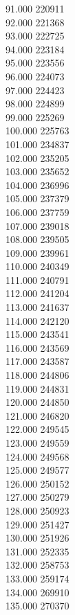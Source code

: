 { 91.000	220911 \\
 92.000	221368 \\
 93.000	222725 \\
 94.000	223184 \\
 95.000	223556 \\
 96.000	224073 \\
 97.000	224423 \\
 98.000	224899 \\
 99.000	225269 \\
 100.000	225763 \\
 101.000	234837 \\
 102.000	235205 \\
 103.000	235652 \\
 104.000	236996 \\
 105.000	237379 \\
 106.000	237759 \\
 107.000	239018 \\
 108.000	239505 \\
 109.000	239961 \\
 110.000	240349 \\
 111.000	240791 \\
 112.000	241204 \\
 113.000	241637 \\
 114.000	242120 \\
 115.000	243541 \\
 116.000	243569 \\
 117.000	243587 \\
 118.000	244806 \\
 119.000	244831 \\
 120.000	244850 \\
 121.000	246820 \\
 122.000	249545 \\
 123.000	249559 \\
 124.000	249568 \\
 125.000	249577 \\
 126.000	250152 \\
 127.000	250279 \\
 128.000	250923 \\
 129.000	251427 \\
 130.000	251926 \\
 131.000	252335 \\
 132.000	258753 \\
 133.000	259174 \\
 134.000	269910 \\
 135.000	270370 \\
}
